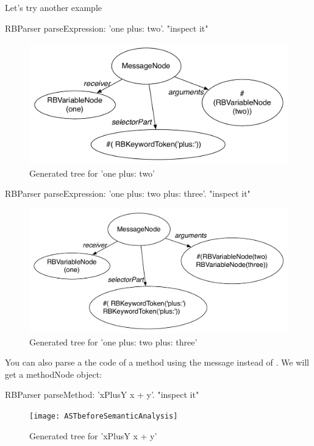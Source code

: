\documentclass[a4paper,10pt,twoside]{book}
\begin{document}
Let's try another example
\begin{code}{}
RBParser parseExpression: 'one plus: two'.
"inspect it"
\end{code}


\begin{figure}[ht]\centering
	\includegraphics[width=0.7\linewidth]{SimpleAtomicExpressionP}
	\caption{Generated tree for  'one plus: two' }
\end{figure}



\begin{code}{}
RBParser parseExpression: 'one plus: two plus: three'.
"inspect it"
\end{code}
\begin{figure}[ht]\centering
	\includegraphics[width=0.7\linewidth]{SimpleMultiExpression}
	\caption{Generated tree for  'one plus: two plus: three' }
\end{figure}

You can also parse a the code of a method using the message  instead of . We will get a methodNode object:

\begin{code}{}
RBParser parseMethod: 'xPlusY x + y'.
"inspect it"
\end{code}



\begin{figure}[ht]\centering
	\texttt{[image: ASTbeforeSemanticAnalysis]}
	\caption{Generated tree for  'xPlusY x + y' }
\end{figure}
\end{document}
